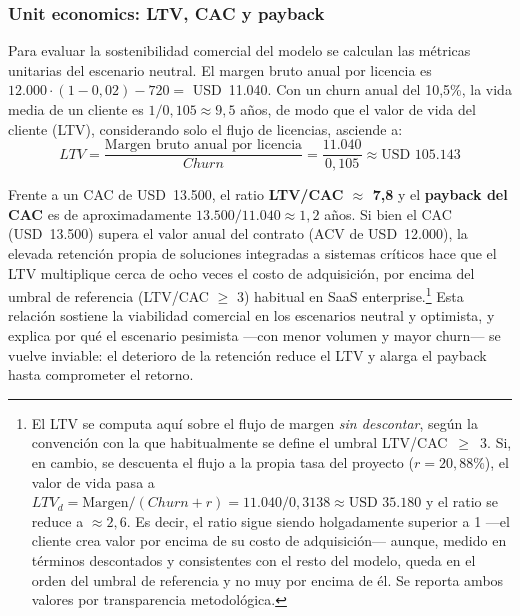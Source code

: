 \subsubsection{Unit economics: LTV, CAC y payback}

Para evaluar la sostenibilidad comercial del modelo se calculan las métricas unitarias del escenario neutral. El margen bruto anual por licencia es $12.000\cdot(1-0{,}02) - 720 = $ USD~11.040. Con un churn anual del 10,5\%, la vida media de un cliente es $1/0{,}105 \approx 9{,}5$ años, de modo que el valor de vida del cliente (LTV), considerando solo el flujo de licencias, asciende a:
\[
LTV = \frac{\text{Margen bruto anual por licencia}}{Churn} = \frac{11.040}{0{,}105} \approx \text{USD } 105.143
\]

Frente a un CAC de USD~13.500, el ratio \textbf{LTV/CAC $\approx$ 7,8} y el \textbf{payback del CAC} es de aproximadamente $13.500/11.040 \approx 1{,}2$ años. Si bien el CAC (USD~13.500) supera el valor anual del contrato (ACV de USD~12.000), la elevada retención propia de soluciones integradas a sistemas críticos hace que el LTV multiplique cerca de ocho veces el costo de adquisición, por encima del umbral de referencia (LTV/CAC $\geq$ 3) habitual en SaaS enterprise.\footnote{El LTV se computa aquí sobre el flujo de margen \emph{sin descontar}, según la convención con la que habitualmente se define el umbral LTV/CAC~$\geq$~3. Si, en cambio, se descuenta el flujo a la propia tasa del proyecto ($r = 20{,}88\%$), el valor de vida pasa a $LTV_d = \text{Margen}/(Churn + r) = 11.040/0{,}3138 \approx \text{USD } 35.180$ y el ratio se reduce a $\approx 2{,}6$. Es decir, el ratio sigue siendo holgadamente superior a 1 —el cliente crea valor por encima de su costo de adquisición— aunque, medido en términos descontados y consistentes con el resto del modelo, queda en el orden del umbral de referencia y no muy por encima de él. Se reporta ambos valores por transparencia metodológica.} Esta relación sostiene la viabilidad comercial en los escenarios neutral y optimista, y explica por qué el escenario pesimista —con menor volumen y mayor churn— se vuelve inviable: el deterioro de la retención reduce el LTV y alarga el payback hasta comprometer el retorno.
